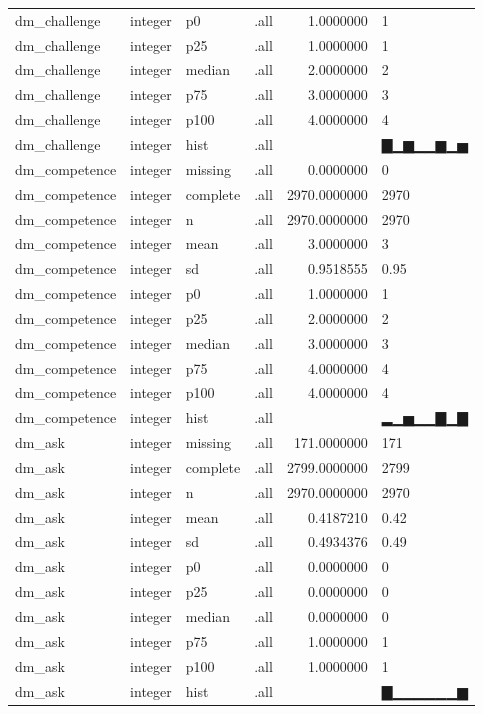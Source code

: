 \documentclass[]{msu-thesis}
\theoremstyle{definition}
\theoremstyle{definition}
\theoremstyle{definition}
\theoremstyle{remark}
\begin{document}
\begin{table}
{\begin{tabular}[t]{llllrl}
dm\_challenge & integer & p0 & .all & 1.0000000 & 1\\
dm\_challenge & integer & p25 & .all & 1.0000000 & 1\\
dm\_challenge & integer & median & .all & 2.0000000 & 2\\
dm\_challenge & integer & p75 & .all & 3.0000000 & 3\\
dm\_challenge & integer & p100 & .all & 4.0000000 & 4\\
dm\_challenge & integer & hist & .all &  & ▇▁▆▁▁▆▁▅\\
dm\_competence & integer & missing & .all & 0.0000000 & 0\\
dm\_competence & integer & complete & .all & 2970.0000000 & 2970\\
dm\_competence & integer & n & .all & 2970.0000000 & 2970\\
dm\_competence & integer & mean & .all & 3.0000000 & 3\\
dm\_competence & integer & sd & .all & 0.9518555 & 0.95\\
dm\_competence & integer & p0 & .all & 1.0000000 & 1\\
dm\_competence & integer & p25 & .all & 2.0000000 & 2\\
dm\_competence & integer & median & .all & 3.0000000 & 3\\
dm\_competence & integer & p75 & .all & 4.0000000 & 4\\
dm\_competence & integer & p100 & .all & 4.0000000 & 4\\
dm\_competence & integer & hist & .all &  & ▂▁▅▁▁▇▁▇\\
dm\_ask & integer & missing & .all & 171.0000000 & 171\\
dm\_ask & integer & complete & .all & 2799.0000000 & 2799\\
dm\_ask & integer & n & .all & 2970.0000000 & 2970\\
dm\_ask & integer & mean & .all & 0.4187210 & 0.42\\
dm\_ask & integer & sd & .all & 0.4934376 & 0.49\\
dm\_ask & integer & p0 & .all & 0.0000000 & 0\\
dm\_ask & integer & p25 & .all & 0.0000000 & 0\\
dm\_ask & integer & median & .all & 0.0000000 & 0\\
dm\_ask & integer & p75 & .all & 1.0000000 & 1\\
dm\_ask & integer & p100 & .all & 1.0000000 & 1\\
dm\_ask & integer & hist & .all &  & ▇▁▁▁▁▁▁▆\\

\end{tabular}}
\end{table}
\end{document}
